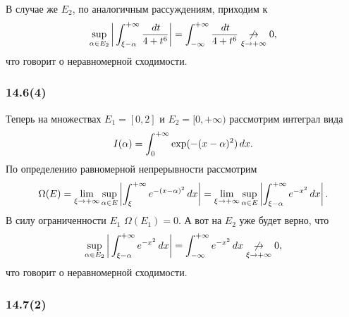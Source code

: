 В случае же $E_2$, по аналогичным рассуждениям, приходим к 
\begin{equation*}
    \sup_{\alpha \in E_2} \bigg|
        \int_{\xi - \alpha}^{+\infty} \frac{
        \, d t
        }{4 + t^6}
    \bigg| = \int_{-\infty}^{+\infty} \frac{\, d t}{4 + t^6} 
    \underset{\xi \to + \infty}{\not \to} 0,
\end{equation*}
что говорит о неравномерной сходимости.




\subsubsection*{14.6(4)}

Теперь на множествах $E_1 = [0, 2]$ и $E_2 = [0, + \infty)$ 
рассмотрим интеграл вида
\begin{equation*}
    I(\alpha) = \int_0^{+\infty} \exp(-(x-\alpha)^2) \, d x.
\end{equation*}
По определению равномерной непрерывности рассмотрим
\begin{equation*}
    \Omega(E) = 
    \lim_{\xi \to + \infty}
    \sup_{\alpha \in E} 
    \left|
    \int_\xi^{+\infty} 
    e^{-(x-\alpha)^2}
    \, d x \right|
    = 
    \lim_{\xi \to + \infty}
    \sup_{\alpha \in E}
    \left|
     \int_{\xi - \alpha}^{+\infty} 
        e^{-x^2}
     \, d x \right|.
\end{equation*}
В силу ограниченности $E_1$ $\Omega(E_1) = 0$. А вот на $E_2$ уже будет верно, что
\begin{equation*}
    \sup_{\alpha \in E_2} \bigg|
        \int_{\xi - \alpha}^{+\infty} e^{-x^2} \, d x
    \bigg| = \int_{-\infty}^{+\infty} e^{-x^2} \, d x
    \underset{\xi \to + \infty}{\not \to} 0,
\end{equation*}
что говорит о неравномерной сходимости.



\subsubsection*{14.7(2)}


